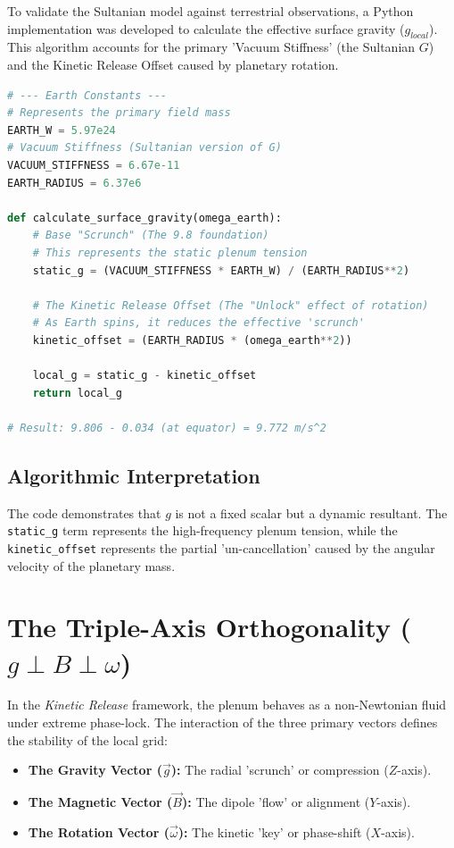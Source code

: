 \documentclass[11pt]{article}
\begin{document}
To validate the Sultanian model against terrestrial observations, a Python implementation was developed to calculate the effective surface gravity ($g_{local}$). This algorithm accounts for the primary 'Vacuum Stiffness' (the Sultanian $G$) and the Kinetic Release Offset caused by planetary rotation.

\begin{lstlisting}[language=Python, caption=Sultanian Surface Gravity Calculation, label=code:gravity_calc]
# --- Earth Constants ---
# Represents the primary field mass
EARTH_W = 5.97e24  
# Vacuum Stiffness (Sultanian version of G)
VACUUM_STIFFNESS = 6.67e-11 
EARTH_RADIUS = 6.37e6

def calculate_surface_gravity(omega_earth):
    # Base "Scrunch" (The 9.8 foundation)
    # This represents the static plenum tension
    static_g = (VACUUM_STIFFNESS * EARTH_W) / (EARTH_RADIUS**2)
    
    # The Kinetic Release Offset (The "Unlock" effect of rotation)
    # As Earth spins, it reduces the effective 'scrunch'
    kinetic_offset = (EARTH_RADIUS * (omega_earth**2))
    
    local_g = static_g - kinetic_offset
    return local_g

# Result: 9.806 - 0.034 (at equator) = 9.772 m/s^2
\end{lstlisting}

\subsection{Algorithmic Interpretation}
The code demonstrates that $g$ is not a fixed scalar but a dynamic resultant. The \texttt{static\_g} term represents the high-frequency plenum tension, while the \texttt{kinetic\_offset} represents the partial 'un-cancellation' caused by the angular velocity of the planetary mass.

\section*{The Triple-Axis Orthogonality ($g \perp B \perp \omega$)}
In the \textit{Kinetic Release} framework, the plenum behaves as a non-Newtonian fluid under extreme phase-lock. The interaction of the three primary vectors defines the stability of the local grid:

\begin{itemize}
    \item \textbf{The Gravity Vector ($\vec{g}$):} The radial 'scrunch' or compression ($Z$-axis).
    \item \textbf{The Magnetic Vector ($\vec{B}$):} The dipole 'flow' or alignment ($Y$-axis).
    \item \textbf{The Rotation Vector ($\vec{\omega}$):} The kinetic 'key' or phase-shift ($X$-axis).
\end{itemize}
\end{document}
